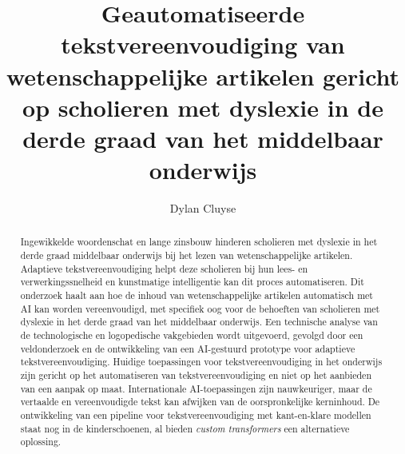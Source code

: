\documentclass{hogent-article}
\title{Geautomatiseerde tekstvereenvoudiging van wetenschappelijke artikelen gericht op scholieren met dyslexie in de derde graad van het middelbaar onderwijs}
\author{Dylan Cluyse}
\begin{document}
	
\begin{abstract}
Ingewikkelde woordenschat en lange zinsbouw hinderen scholieren met dyslexie in het derde graad middelbaar onderwijs bij het lezen van wetenschappelijke artikelen. Adaptieve tekstvereenvoudiging helpt deze scholieren bij hun lees- en verwerkingssnelheid en kunstmatige intelligentie kan dit proces automatiseren. Dit onderzoek haalt aan hoe de inhoud van wetenschappelijke artikelen automatisch  met AI kan worden vereenvoudigd, met specifiek oog voor de behoeften van scholieren met dyslexie in het derde graad van het middelbaar onderwijs. Een technische analyse van de technologische en logopedische vakgebieden wordt uitgevoerd, gevolgd door een veldonderzoek en de ontwikkeling van een AI-gestuurd prototype voor adaptieve tekstvereenvoudiging. Huidige toepassingen voor tekstvereenvoudiging in het onderwijs zijn gericht op het automatiseren van tekstvereenvoudiging en niet op het aanbieden van een aanpak op maat. Internationale AI-toepassingen zijn nauwkeuriger, maar de vertaalde en vereenvoudigde tekst kan afwijken van de oorspronkelijke kerninhoud. De ontwikkeling van een pipeline voor tekstvereenvoudiging met kant-en-klare modellen staat nog in de kinderschoenen, al bieden \textit{custom transformers} een alternatieve oplossing.
\end{abstract}

\tableofcontents



\printbibliography[heading=bibintoc]
\end{document}
